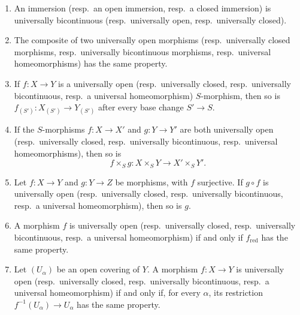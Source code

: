 \begin{proposition}[2.4.3]
\label{IV.2.4.3}
\medskip\noindent
\begin{enumerate}
  \item[(i)] An immersion \textnormal{(}resp.\ an open immersion, resp.\ a closed immersion\textnormal{)} is universally bicontinuous \textnormal{(}resp.\ universally open, resp.\ universally closed\textnormal{)}.
  \item[(ii)] The composite of two universally open morphisms \textnormal{(}resp.\ universally closed morphisms, resp.\ universally bicontinuous morphisms, resp.\ universal homeomorphisms\textnormal{)} has the same property.
  \item[(iii)] If $f:X\to Y$ is a universally open \textnormal{(}resp.\ universally closed, resp.\ universally bicontinuous, resp.\ a universal homeomorphism\textnormal{)} $S$-morphism, then so is $f_{(S')}:X_{(S')}\to Y_{(S')}$ after every base change $S'\to S$.
  \item[(iv)] If the $S$-morphisms $f:X\to X'$ and $g:Y\to Y'$ are both universally open \textnormal{(}resp.\ universally closed, resp.\ universally bicontinuous, resp.\ universal homeomorphisms\textnormal{)}, then so is
  \[
    f\times_S g:X\times_S Y\longrightarrow X'\times_S Y'.
  \]
  \item[(v)] Let $f:X\to Y$ and $g:Y\to Z$ be morphisms, with $f$ surjective. If $g\circ f$ is universally open \textnormal{(}resp.\ universally closed, resp.\ universally bicontinuous, resp.\ a universal homeomorphism\textnormal{)}, then so is $g$.
  \item[(vi)] A morphism $f$ is universally open \textnormal{(}resp.\ universally closed, resp.\ universally bicontinuous, resp.\ a universal homeomorphism\textnormal{)} if and only if $f_{\mathrm{red}}$ has the same property.
  \item[(vii)] Let $(U_\alpha)$ be an open covering of $Y$. A morphism $f:X\to Y$ is universally open \textnormal{(}resp.\ universally closed, resp.\ universally bicontinuous, resp.\ a universal homeomorphism\textnormal{)} if and only if, for every $\alpha$, its restriction $f^{-1}(U_\alpha)\to U_\alpha$ has the same property.
\end{enumerate}
\end{proposition}

